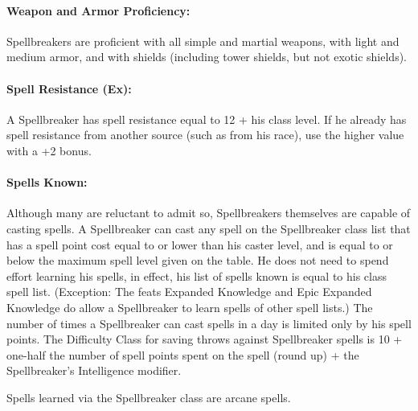 \paragraph{Weapon and Armor Proficiency:} 
Spellbreakers are proficient with all simple and martial weapons, with light and medium armor, and with shields (including tower shields, but not exotic shields).


\paragraph{Spell Resistance (Ex):} A Spellbreaker has spell resistance equal to 12 + his class level. If he already has spell resistance from another source (such as from his race), use the higher value with a +2 bonus. %

\paragraph{Spells Known:} Although many are reluctant to admit so, Spellbreakers themselves are capable of casting spells.
A Spellbreaker can cast any spell on the Spellbreaker class list that has a spell point cost equal to or lower than his caster level, and is equal to or below the maximum spell level given on the  table. He does not need to spend effort learning his spells, in effect, his list of spells known is equal to his class spell list. (Exception: The feats Expanded Knowledge and Epic Expanded Knowledge do allow a Spellbreaker to learn spells of other spell lists.) 
The number of times a Spellbreaker can cast spells in a day is limited only by his spell points. 
The Difficulty Class for saving throws against Spellbreaker spells is 10 + one-half the number of spell points spent on the spell (round up) + the Spellbreaker's Intelligence modifier.

Spells learned via the Spellbreaker class are arcane spells.
